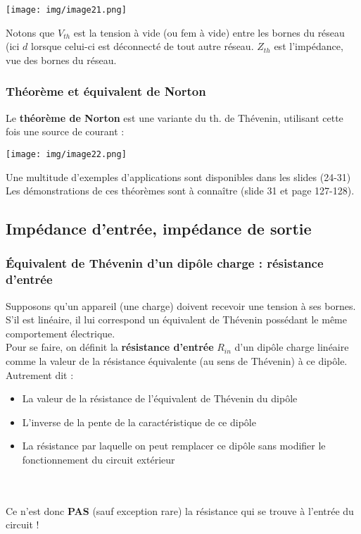 \begin{center}
\texttt{[image: img/image21.png]}
\end{center}
Notons que $V_{th}$ est la tension à vide (ou fem à vide) entre les bornes du réseau (ici $d$ lorsque celui-ci est déconnecté de tout autre réseau. 
$Z_{th}$ est l'impédance, vue des bornes du réseau.


\subsubsection{Théorème et équivalent de Norton}
Le \textbf{théorème de Norton} est une variante du th. de Thévenin, utilisant cette fois une source de courant :\\
\begin{center}
\texttt{[image: img/image22.png]}
\end{center}


Une multitude d'exemples d'applications sont disponibles dans les slides (24-31)\\
Les démonstrations de ces théorèmes sont à connaître (slide 31 et page 127-128).

\subsection{Impédance d'entrée, impédance de sortie}
\subsubsection{Équivalent de Thévenin d'un dipôle charge : résistance d'entrée}
Supposons qu'un appareil (une charge) doivent recevoir une tension à ses bornes. S'il est linéaire, il lui correspond un équivalent de Thévenin possédant le même comportement électrique.\\

Pour se faire, on définit la \textbf{résistance d'entrée} $R_{in}$ d'un dipôle charge linéaire comme la valeur de la résistance équivalente (au sens de Thévenin) à ce dipôle. Autrement dit :
\begin{itemize}
\item La valeur de la résistance de l'équivalent de Thévenin du dipôle
\item L'inverse de la pente de la caractéristique de ce dipôle
\item La résistance par laquelle on peut remplacer ce dipôle sans modifier le fonctionnement du circuit extérieur
\end{itemize}\ \\
\ \\
Ce n'est donc \textbf{PAS} (sauf exception rare) la résistance qui se trouve à l'entrée du circuit !
